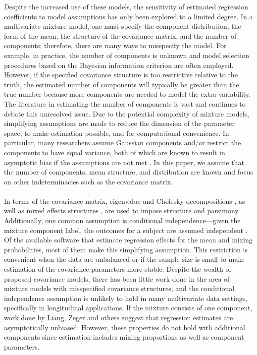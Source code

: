 \documentclass[10pt]{article}
\begin{document}
 Despite the increased use of these models, the sensitivity of estimated regression coefficients to model assumptions has only been explored to a limited degree. In a multivariate mixture model, one must specify the component distribution, the form of the mean, the structure of the covariance matrix, and  the number of components; therefore, there are many ways to misspecify the model. For example, in practice, the number of components is unknown and model selection procedures based on the Bayesian information criterion are often employed. However, if the specified covariance structure is too restrictive relative to the truth, the estimated number of components will typically be greater than the true number because more components are needed to model the extra variability. The literature in estimating the number of components is  vast \cite{oliveira2005} and continues to debate this unresolved issue. Due to the potential complexity of mixture models, simplifying assumptions are made to reduce the dimension of the parameter space, to make estimation possible, and for computational convenience. In particular, many researchers assume Gaussian components and/or restrict the components to have equal variance, both of which are known to result in asymptotic bias if the assumptions are not met \cite{gray1994, lo2011}. In this paper, we assume that the number of components, mean structure, and distribution are known and focus on other indeterminacies such as the covariance matrix.\\\\
In terms of the covariance matrix, eigenvalue and Cholesky decompositions \cite{banfield1993,mcnicholas2010}, as well as mixed effects structures \cite{muthen1999}, are used to impose structure and parsimony. Additionally, one common assumption is conditional independence---given the mixture component label, the outcomes for a subject are assumed independent \cite{ostbye2011,muthen2008}. Of the available software that estimate regression effects for the mean and mixing probabilities, most of them make this simplifying assumption. This restriction is convenient when the data are unbalanced or if the sample size is small to make estimation of the covariance parameters more stable. Despite the wealth of proposed covariance models, there has been little work done in the area of mixture models with misspecified covariance structures, and the conditional independence assumption is unlikely to hold in many multivariate data settings, specifically in longitudinal applications. If the mixture consists of one component, work done by Liang, Zeger \cite{liang1986} and others suggest that regression estimates are asymptotically unbiased. However, these properties do not hold with additional components since estimation includes mixing proportions as well as component parameters. \\\\
\end{document}
